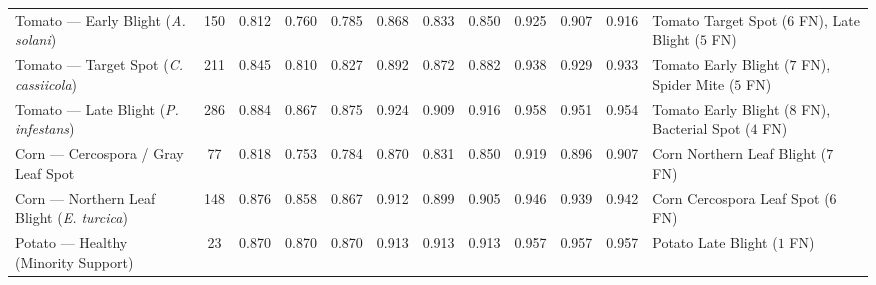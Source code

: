 \documentclass[journal]{IEEEtran}
\begin{document}
\begin{table}[!t]
{\begin{tabular}{lc|ccc|ccc|ccc|l}
Tomato --- Early Blight (\textit{A. solani}) & 150 & 0.812 & 0.760 & 0.785 & 0.868 & 0.833 & 0.850 & 0.925 & 0.907 & 0.916 & Tomato Target Spot ($6$ FN), Late Blight ($5$ FN) \\
Tomato --- Target Spot (\textit{C. cassiicola}) & 211 & 0.845 & 0.810 & 0.827 & 0.892 & 0.872 & 0.882 & 0.938 & 0.929 & 0.933 & Tomato Early Blight ($7$ FN), Spider Mite ($5$ FN) \\
Tomato --- Late Blight (\textit{P. infestans}) & 286 & 0.884 & 0.867 & 0.875 & 0.924 & 0.909 & 0.916 & 0.958 & 0.951 & 0.954 & Tomato Early Blight ($8$ FN), Bacterial Spot ($4$ FN) \\
Corn --- Cercospora / Gray Leaf Spot & 77  & 0.818 & 0.753 & 0.784 & 0.870 & 0.831 & 0.850 & 0.919 & 0.896 & 0.907 & Corn Northern Leaf Blight ($7$ FN) \\
Corn --- Northern Leaf Blight (\textit{E. turcica}) & 148 & 0.876 & 0.858 & 0.867 & 0.912 & 0.899 & 0.905 & 0.946 & 0.939 & 0.942 & Corn Cercospora Leaf Spot ($6$ FN) \\
Potato --- Healthy (Minority Support) & 23  & 0.870 & 0.870 & 0.870 & 0.913 & 0.913 & 0.913 & 0.957 & 0.957 & 0.957 & Potato Late Blight ($1$ FN) \\
\bottomrule
\end{tabular}%
}
\end{table}
\end{document}
